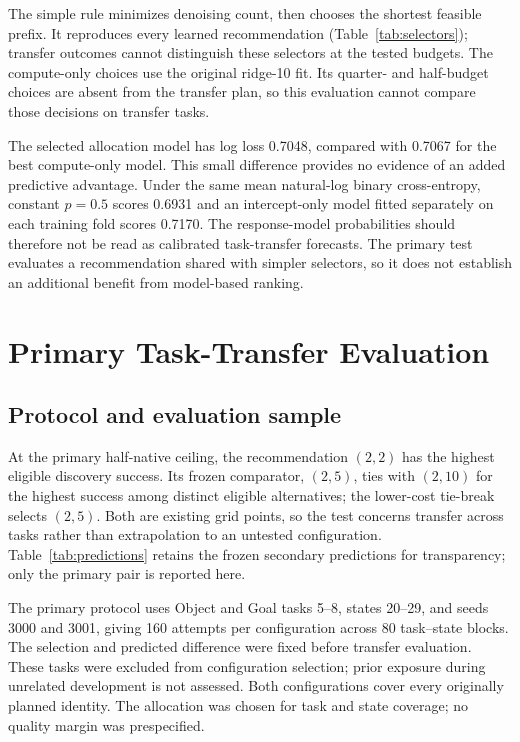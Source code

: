 \documentclass{article}
\begin{document}
The simple rule minimizes denoising count, then chooses the shortest feasible
prefix. It reproduces every learned recommendation (Table~\ref{tab:selectors});
transfer outcomes cannot distinguish these selectors at the tested budgets.
The compute-only choices use the original ridge-10 fit. Its quarter- and
half-budget choices are absent from the transfer plan, so this evaluation
cannot compare those decisions on transfer tasks.

The selected allocation model has log loss 0.7048, compared with 0.7067 for the
best compute-only model. This small difference provides no evidence of an added
predictive advantage. Under the same mean natural-log binary cross-entropy,
constant $p=0.5$ scores 0.6931 and an intercept-only model fitted separately on
each training fold scores 0.7170. The response-model probabilities should
therefore not be read as calibrated task-transfer forecasts. The primary test
evaluates a recommendation shared with simpler selectors, so it does not
establish an additional benefit from model-based ranking.

\FloatBarrier

\section{Primary Task-Transfer Evaluation}
\label{sec:transfer}

\subsection{Protocol and evaluation sample}

At the primary half-native ceiling, the recommendation $(2,2)$ has the highest
eligible discovery success. Its frozen comparator, $(2,5)$, ties with $(2,10)$
for the highest success among distinct eligible alternatives; the lower-cost
tie-break selects $(2,5)$. Both are existing grid points, so
the test concerns transfer across tasks rather than extrapolation to an untested
configuration. Table~\ref{tab:predictions} retains the frozen secondary
predictions for transparency; only the primary pair is reported here.

The primary protocol uses Object and Goal tasks 5--8, states 20--29,
and seeds 3000 and 3001, giving 160 attempts per configuration across
80 task--state blocks. The selection and predicted difference were fixed before
transfer evaluation. These tasks were excluded from configuration selection;
prior exposure during unrelated development is not assessed. Both configurations
cover every originally planned identity. The allocation was chosen for task and
state coverage; no quality margin was prespecified.
\end{document}
